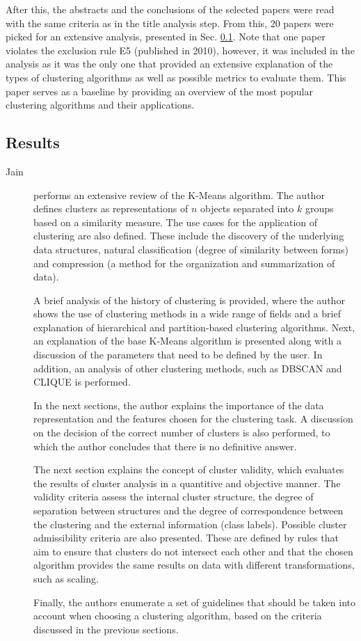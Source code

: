 After this, the abstracts and the conclusions of the selected papers were read with the same criteria as in the title analysis step. From this, 20 papers were picked for an extensive analysis, presented in Sec. \ref{sec:clustering_sota_results}. Note that one paper violates the exclusion rule E5 (published in 2010), however, it was included in the analysis as it was the only one that provided an extensive explanation of the types of clustering algorithms as well as possible metrics to evaluate them. This paper serves as a baseline by providing an overview of the most popular clustering algorithms and their applications. 


\subsection{Results}\label{sec:clustering_sota_results}
\begin{description}
    \item[Jain]\cite{Jain_Dataclustering50_2010} performs an extensive review of the K-Means algorithm. The author defines clusters as representations of $n$ objects separated into $k$ groups based on a similarity measure. The use cases for the application of clustering are also defined. These include the discovery of the underlying data structures, natural classification (degree of similarity between forms) and compression (a method for the organization and summarization of data).
    
    A brief analysis of the history of clustering is provided, where the author shows the use of clustering methods in a wide range of fields and a brief explanation of hierarchical and partition-based clustering algorithms. Next, an explanation of the base K-Means algorithm is presented along with a discussion of the parameters that need to be defined by the user. In addition, an analysis of other clustering methods, such as DBSCAN and CLIQUE is performed. 

    In the next sections, the author explains the importance of the data representation and the features chosen for the clustering task. A discussion on the decision of the correct number of clusters is also performed, to which the author concludes that there is no definitive answer.

    The next section explains the concept of cluster validity, which evaluates the results of cluster analysis in a quantitive and objective manner. The validity criteria assess the internal cluster structure, the degree of separation between structures and the degree of correspondence between the clustering and the external information (class labels). Possible cluster admissibility criteria are also presented. These are defined by rules that aim to ensure that clusters do not intersect each other and that the chosen algorithm provides the same results on data with different transformations, such as scaling.
    
    Finally, the authors enumerate a set of guidelines that should be taken into account when choosing a clustering algorithm, based on the criteria discussed in the previous sections.
\end{description}

